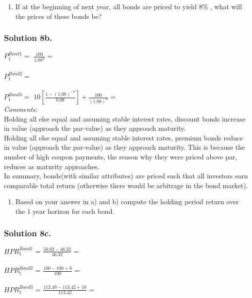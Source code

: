 \documentclass[12]{article}
\begin{document}
\noindent
\color{black}
\begin{enumerate}
    \item[b)] If at the beginning of next year, all bonds are priced to yield 8\% , what will the prices of these bonds be?
\end{enumerate}

\color{blue}
\subsubsection*{Solution 8b.}
$P_1^{Bond 1} =$ {\Large $\frac{100}{1.08^{9}}$} = \\
\\
$P_1^{Bond 2} =$ \\
\\
$P_1^{Bond 3} =$ {\Large $10[\frac{1 - (1.08)^{-9}}{0.08}] + \frac{100}{(1.08)^{9}}$} =  \\

\noindent
\textit{Comments:} \\
Holding all else equal and assuming stable interest rates, discount bonds increase in value (approach the par-value) as they approach maturity. \\
Holding all else equal and assuming stable interest rates, premium bonds reduce in value (approach the par-value) as they approach maturity. This is because the number of high coupon payments, the reason why they were priced above par, reduces as maturity approaches.\\
In summary, bonds(with similar attributes) are priced such that all investors earn comparable total return (otherwise there would be arbitrage in the bond market). 



\noindent
\color{black}
\begin{enumerate}
    \item[c)] Based on your answer in a) and b) compute the holding period return over the 1 year horizon for each bond. 
\end{enumerate}


\color{blue}
\subsubsection*{Solution 8c.}
$HPR_1^{Bond 1}$ = {\Large $\frac{50.02 - 46.32 }{46.32}$ }= \\
\\
$HPR_1^{Bond 2}$ = {\Large $\frac{100 - 100 + 8 }{100}$ }= \\
\\
$HPR_1^{Bond 3}$ = {\Large $\frac{112.49 - 113.42 + 10 }{113.42}$ }= \\
\end{document}
